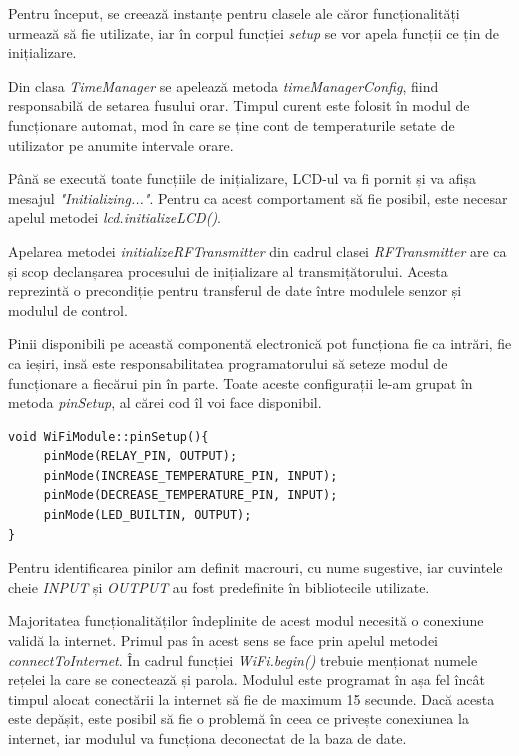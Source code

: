 \vspace{2em}

	Pentru început, se creează instanțe pentru clasele ale căror funcționalități urmează să fie utilizate, iar în corpul funcției \textit{setup} se vor apela funcții ce țin de inițializare.

	Din clasa \textit{TimeManager} se apelează metoda \textit{timeManagerConfig}, fiind responsabilă de setarea fusului orar. Timpul curent este folosit în modul de funcționare automat, mod în care se ține cont de temperaturile setate de utilizator pe anumite intervale orare. 

	Până se execută toate funcțiile de inițializare, LCD-ul va fi pornit și va afișa mesajul \textit{"Initializing..."}. Pentru ca acest comportament să fie posibil, este necesar apelul metodei \textit{lcd.initializeLCD()}. 	

	Apelarea metodei \textit{initializeRFTransmitter} din cadrul clasei \textit{RFTransmitter} are ca și scop declanșarea procesului de inițializare al transmițătorului. Acesta reprezintă o precondiție pentru transferul de date între modulele senzor și modulul de control.

	Pinii disponibili pe această componentă electronică pot funcționa fie ca intrări, fie ca ieșiri, insă este responsabilitatea programatorului să seteze modul de funcționare a fiecărui pin în parte. Toate aceste configurații le-am grupat în metoda \textit{pinSetup}, al cărei cod îl voi face disponibil.

\vspace{1em}

\begin{lstlisting}
void WiFiModule::pinSetup(){
     pinMode(RELAY_PIN, OUTPUT);
     pinMode(INCREASE_TEMPERATURE_PIN, INPUT);
     pinMode(DECREASE_TEMPERATURE_PIN, INPUT);
     pinMode(LED_BUILTIN, OUTPUT);
}
\end{lstlisting}

\vspace{2em}	

	Pentru identificarea pinilor am definit macrouri, cu nume sugestive, iar cuvintele cheie \textit{INPUT} și \textit{OUTPUT} au fost predefinite în bibliotecile utilizate.

	Majoritatea funcționalităților îndeplinite de acest modul necesită o conexiune validă la internet. Primul pas în acest sens se face prin apelul metodei \textit{connectToInternet}. În cadrul funcției \textit{WiFi.begin()} trebuie menționat numele rețelei la care se conectează și parola. Modulul este programat în așa fel încât timpul alocat conectării la internet să fie de maximum 15 secunde. Dacă acesta este depășit, este posibil să fie o problemă în ceea ce privește conexiunea la internet, iar modulul va funcționa deconectat de la baza de date.
 

